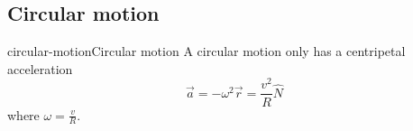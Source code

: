 \documentclass[preview]{standalone}
\begin{document}

\subsection{Circular motion}

\begin{snippetproposition}{circular-motion}{Circular motion}
    A circular motion only has a centripetal acceleration
    \[
        \vec{a} = -\omega^2\vec{r} = \frac{v^2}{R} \hat{N}
    \]
    where \(\omega = \frac{v}{R}\).
\end{snippetproposition}
\end{document}
